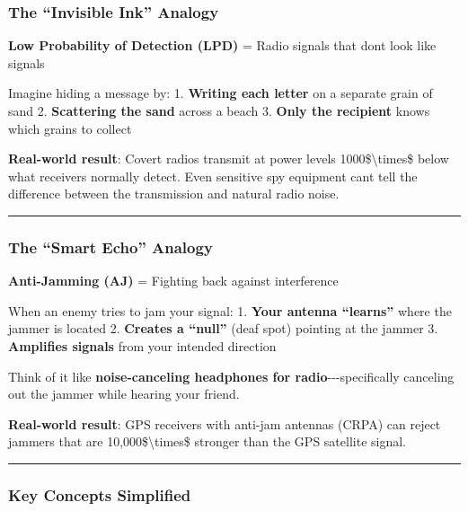 \subsubsection{The ``Invisible Ink''
Analogy}\label{the-invisible-ink-analogy}

\textbf{Low Probability of Detection (LPD)} = Radio signals that
don\textquotesingle t look like signals

Imagine hiding a message by: 1. \textbf{Writing each letter} on a
separate grain of sand 2. \textbf{Scattering the sand} across a beach 3.
\textbf{Only the recipient} knows which grains to collect

\textbf{Real-world result}: Covert radios transmit at power levels
1000\$\textbackslash times\$ below what receivers normally detect. Even
sensitive spy equipment can\textquotesingle t tell the difference
between the transmission and natural radio noise.

\begin{center}\rule{0.5\linewidth}{0.5pt}\end{center}

\subsubsection{The ``Smart Echo'' Analogy}\label{the-smart-echo-analogy}

\textbf{Anti-Jamming (AJ)} = Fighting back against interference

When an enemy tries to jam your signal: 1. \textbf{Your antenna
``learns''} where the jammer is located 2. \textbf{Creates a ``null''}
(deaf spot) pointing at the jammer 3. \textbf{Amplifies signals} from
your intended direction

Think of it like \textbf{noise-canceling headphones for
radio}-\/-\/-specifically canceling out the jammer while hearing your
friend.

\textbf{Real-world result}: GPS receivers with anti-jam antennas (CRPA)
can reject jammers that are 10,000\$\textbackslash times\$ stronger than
the GPS satellite signal.

\begin{center}\rule{0.5\linewidth}{0.5pt}\end{center}

\subsubsection{Key Concepts Simplified}\label{key-concepts-simplified}

